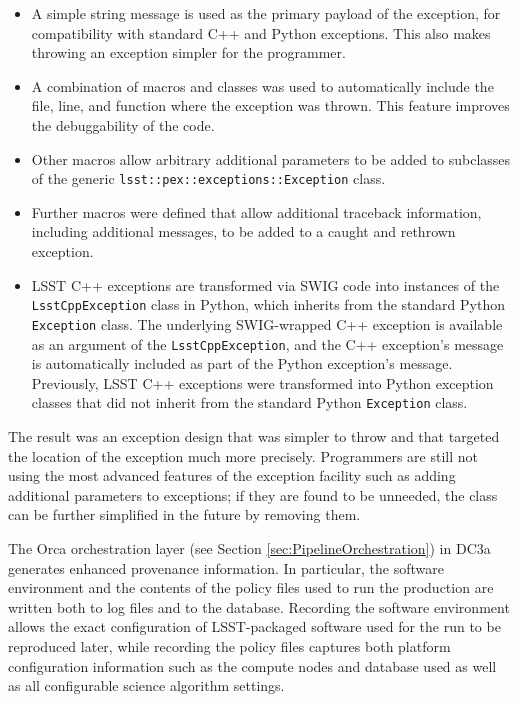 \begin{itemize}

\item A simple string message is used as the primary payload of the
exception, for compatibility with standard C++ and Python exceptions.
This also makes throwing an exception simpler for the programmer.

\item A combination of macros and classes was used to automatically
include the file, line, and function where the exception was thrown.
This feature improves the debuggability of the code.

\item Other macros allow arbitrary additional parameters to be added to
subclasses of the generic {\tt lsst::pex::exceptions::Exception} class.

\item Further macros were defined that allow additional traceback
information, including additional messages, to be added to a caught and
rethrown exception.

\item LSST C++ exceptions are transformed via SWIG code into instances
of the {\tt LsstCppException} class in Python, which inherits from the
standard Python {\tt Exception} class.  The underlying SWIG-wrapped C++
exception is available as an argument of the {\tt LsstCppException}, and
the C++ exception's message is automatically included as part of the
Python exception's message.  Previously, LSST C++ exceptions were
transformed into Python exception classes that did not inherit from the
standard Python {\tt Exception} class.

\end{itemize}

The result was an exception design that was simpler to throw and that
targeted the location of the exception much more precisely.  Programmers
are still not using the most advanced features of the exception facility
such as adding additional parameters to exceptions; if they are found to be
unneeded, the class can be further simplified in the future by removing
them.


The Orca orchestration layer (see Section
\ref{sec:PipelineOrchestration}) in DC3a generates enhanced provenance
information.  In particular, the software environment and the contents
of the policy files used to run the production are written both to log
files and to the database.  Recording the software environment allows
the exact configuration of LSST-packaged software used for the run to be
reproduced later, while recording the policy files captures both
platform configuration information such as the compute nodes and
database used as well as all configurable science algorithm settings.

